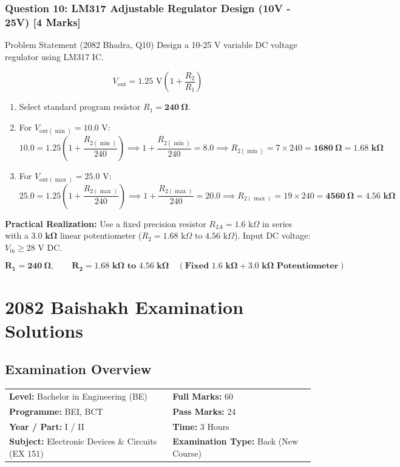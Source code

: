 \documentclass[11pt,a4paper,oneside]{book}
\begin{document}
\vspace{0.6cm}

\subsection{Question 10: LM317 Adjustable Regulator Design (10V - 25V) [4 Marks]}
\begin{questionbox}{Problem Statement (2082 Bhadra, Q10)}
Design a 10-25 V variable DC voltage regulator using LM317 IC.
\end{questionbox}

\[
V_{\text{out}} = 1.25\text{ V} \left(1 + \frac{R_2}{R_1}\right)
\]
\begin{enumerate}[leftmargin=1.5em]
  \item Select standard program resistor $R_1 = \mathbf{240\ \Omega}$.
  \item For $V_{\text{out}(\min)} = 10.0\text{ V}$:
  \[
  10.0 = 1.25 \left(1 + \frac{R_{2(\min)}}{240}\right) \implies 1 + \frac{R_{2(\min)}}{240} = 8.0 \implies R_{2(\min)} = 7 \times 240 = \mathbf{1680\ \Omega} = \mathbf{1.68\text{ k}\Omega}
  \]
  \item For $V_{\text{out}(\max)} = 25.0\text{ V}$:
  \[
  25.0 = 1.25 \left(1 + \frac{R_{2(\max)}}{240}\right) \implies 1 + \frac{R_{2(\max)}}{240} = 20.0 \implies R_{2(\max)} = 19 \times 240 = \mathbf{4560\ \Omega} = \mathbf{4.56\text{ k}\Omega}
  \]
\end{enumerate}
\textbf{Practical Realization:} Use a fixed precision resistor $R_{2A} = 1.6\text{ k}\Omega$ in series with a $\mathbf{3.0\text{ k}\Omega}$ linear potentiometer ($R_2 = 1.68\text{ k}\Omega \text{ to } 4.56\text{ k}\Omega$). Input DC voltage: $V_{\text{in}} \ge 28\text{ V DC}$.

\begin{answerbox}
$$\mathbf{R_1 = 240\ \Omega, \qquad R_2 = 1.68\text{ k}\Omega \text{ to } 4.56\text{ k}\Omega \quad (\text{Fixed } 1.6\text{ k}\Omega + 3.0\text{ k}\Omega \text{ Potentiometer})}$$
\end{answerbox}

\chapter{2082 Baishakh Examination Solutions}

\section*{Examination Overview}
\begin{tabular}{@{}ll@{}}
\textbf{Level:} Bachelor in Engineering (BE) & \textbf{Full Marks:} 60 \\
\textbf{Programme:} BEI, BCT & \textbf{Pass Marks:} 24 \\
\textbf{Year / Part:} I / II & \textbf{Time:} 3 Hours \\
\textbf{Subject:} Electronic Devices \& Circuits (EX 151) & \textbf{Examination Type:} Back (New Course) \\
\end{tabular}
\end{document}
